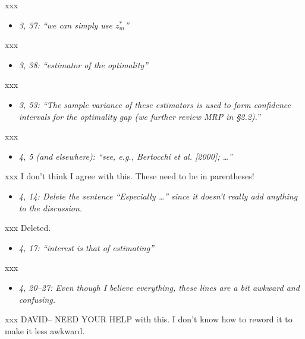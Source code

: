 \documentclass[11pt,notitlepage,onecolumn]{article}
\newcommand{\noi}{\noindent}
\begin{document}
\noi
xxx  
\medskip 


\begin{itemize}
\item[] \textit{3, 37: ``we can simply use $z_m^*$''}
\end{itemize}

\noi
xxx  
\medskip 


\begin{itemize}
\item[] \textit{3, 38: ``estimator of the optimality''}
\end{itemize}

\noi
xxx  
\medskip 


\begin{itemize}
\item[] \textit{3, 53: ``The sample variance of these estimators is used to form confidence intervals for the optimality gap (we further review MRP in \S 2.2).''}
\end{itemize}

\noi
xxx  
\medskip 


\begin{itemize}
\item[] \textit{4, 5 (and elsewhere): ``see, e.g., Bertocchi et al. [2000]; \ldots ''}
\end{itemize}

\noi
xxx  I don't think I agree with this. 
These need to be in parentheses! 
\medskip 


\begin{itemize}
\item[] \textit{4, 14: Delete the sentence ``Especially \ldots '' since it doesn't really add anything to the discussion.}
\end{itemize}

\noi
xxx  Deleted.
\medskip 


\begin{itemize}
\item[] \textit{4, 17: ``interest is that of estimating''}
\end{itemize}

\noi
xxx  
\medskip 


\begin{itemize}
\item[] \textit{4, 20--27: Even though I believe everything, these lines are a bit awkward and confusing.}
\end{itemize}

\noi
xxx   DAVID-- NEED YOUR HELP with this. 
I don't know how to reword it to make it less awkward.
\medskip 
\end{document}
